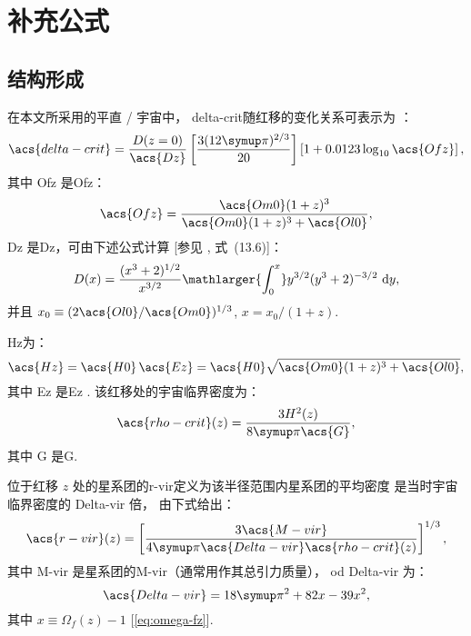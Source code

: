 
\chapter{补充公式}
\label{chap:formulas}

\section{结构形成}

在本文所采用的平直 \lcdm/ 宇宙中，
\ac{delta-crit}随红移的变化关系可表示为 \cite{kitayama1996,randall2002}：
\begin{equation}
  \label{eq:delta-crit}
  \acs{delta-crit} = \frac{D(z=0)}{\acs{Dz}}
    \left[ \frac{3 (12\Cpi)^{2/3}}{20} \right]
    \left[1 + 0.0123 \log_{10} \acs{Ofz} \right] ,
\end{equation}
其中 \acs{Ofz} 是\acl{Ofz}：
\begin{equation}
  \label{eq:omega-fz}
  \acs{Ofz} = \frac{\acs{Om0} (1+z)^3}{\acs{Om0} (1+z)^3 + \acs{Ol0}} ,
\end{equation}
\acs{Dz} 是\acl{Dz}，可由下述公式计算
[参见 , 式~(13.6)]：
\begin{equation}
  \label{eq:growth-factor}
  D(x) = \frac{(x^3 + 2)^{1/2}}{x^{3/2}}
    \mathlarger{\int_0^x} y^{3/2} (y^3 + 2)^{-3/2} \,\D{y} ,
\end{equation}
并且 $x_0 \equiv (2 \acs{Ol0}/\acs{Om0})^{1/3}$,
$x = x_0 / (1+z)$.

\acl{Hz}为：
\begin{equation}
  \label{eq:hubble-z}
  \acs{Hz} = \acs{H0} \, \acs{Ez}
    = \acs{H0} \sqrt{\acs{Om0} (1+z)^3 + \acs{Ol0}} ,
\end{equation}
其中 \acs{Ez} 是\acl{Ez} \cite{hogg1999}.
该红移处的宇宙临界密度为：
\begin{equation}
  \label{eq:rho-crit}
  \acs{rho-crit}(z) = \frac{3 H^2(z)}{8 \Cpi \acs{G}} ,
\end{equation}
其中 \acs{G} 是\acl{G}.

位于红移 $z$ 处的星系团的\acf{r-vir}定义为该半径范围内星系团的平均密度
是当时宇宙临界密度的 \acs{Delta-vir} 倍，
由下式给出：
\begin{equation}
  \label{eq:radius-virial}
  \acs{r-vir}(z) = \left[
    \frac{3 \acs{M-vir}}{4\Cpi \acs{Delta-vir} \acs{rho-crit}(z)}
  \right]^{1/3},
\end{equation}
其中 \acs{M-vir} 是星系团的\acl{M-vir}（通常用作其总引力质量），
\acf{od} \acs{Delta-vir} 为\cite{bryan1998}：
\begin{equation}
  \label{eq:delta-vir}
  \acs{Delta-vir} = 18\Cpi^2 + 82 x - 39 x^2,
\end{equation}
其中 $x \equiv \Omega_f(z) - 1$ [\autoref{eq:omega-fz}].


